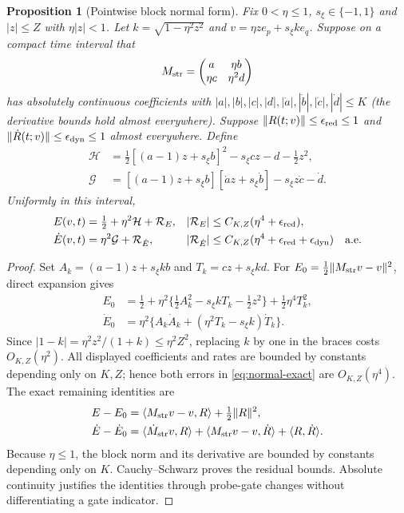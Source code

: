 \documentclass[10pt]{article}
\newtheorem{proposition}[theorem]{Proposition}
\theoremstyle{remark}\newtheorem{remark}[theorem]{Remark}
\begin{document}
\begin{proposition}[Pointwise block normal form]\label{prop:pointwise-normal}
Fix $0<\eta\le1$, $s_\xi\in\{-1,1\}$ and $|z|\le Z$ with $\eta|z|<1$.
Let $k=\sqrt{1-\eta^2z^2}$ and $v=\eta z e_p+s_\xi k e_q$.
Suppose on a compact time interval that
\[
 M_{\rm str}=\begin{pmatrix}a&\eta b\\\eta c&\eta^2d\end{pmatrix}
\]
has absolutely continuous coefficients with
$|a|,|b|,|c|,|d|,|\dot a|,|\dot b|,|\dot c|,|\dot d|\le K$
(the derivative bounds hold almost everywhere). Suppose
$\|R(t;v)\|\le\epsilon_{\rm red}\le1$ and
$\|\dot R(t;v)\|\le\epsilon_{\rm dyn}\le1$ almost everywhere.
Define
\begin{align}
 \mathcal H&=\tfrac12[(a-1)z+s_\xi b]^2-s_\xi cz-d-\tfrac12z^2,
 \label{eq:normal-H}\\
 \mathcal G&=[(a-1)z+s_\xi b][\dot a z+s_\xi\dot b]
              -s_\xi z\dot c-\dot d.\label{eq:normal-G}
\end{align}
Uniformly in this interval,
\begin{align*}
 E(v,t)&=\tfrac12+\eta^2\mathcal H+\mathcal R_E,
 &|\mathcal R_E|&\le C_{K,Z}(\eta^4+\epsilon_{\rm red}),\\
 \dot E(v,t)&=\eta^2\mathcal G+\mathcal R_{\dot E},
 &|\mathcal R_{\dot E}|&\le C_{K,Z}(\eta^4+\epsilon_{\rm red}+\epsilon_{\rm dyn})
 \quad\text{a.e.}
\end{align*}
\end{proposition}
\begin{proof}
Set $A_k=(a-1)z+s_\xi k b$ and $T_k=cz+s_\xi k d$.
For $E_0=\tfrac12\|M_{\rm str}v-v\|^2$, direct expansion gives
\begin{align}\label{eq:normal-exact}
 E_0&=\tfrac12+\eta^2\{\tfrac12A_k^2-s_\xi kT_k-\tfrac12z^2\}
                     +\tfrac12\eta^4T_k^2,\\
 \dot E_0&=\eta^2\{A_k\dot A_k+(\eta^2T_k-s_\xi k)\dot T_k\}.
 \nonumber
\end{align}
Since $|1-k|=\eta^2z^2/(1+k)\le\eta^2Z^2$, replacing $k$ by one
in the braces costs $O_{K,Z}(\eta^2)$. All displayed coefficients and
rates are bounded by constants depending only on $K,Z$; hence both
errors in \eqref{eq:normal-exact} are $O_{K,Z}(\eta^4)$.
The exact remaining identities are
\begin{align*}
 E-E_0&=\langle M_{\rm str}v-v,R\rangle+\tfrac12\|R\|^2,\\
 \dot E-\dot E_0&=\langle\dot M_{\rm str}v,R\rangle
 +\langle M_{\rm str}v-v,\dot R\rangle+\langle R,\dot R\rangle.
\end{align*}
Because $\eta\le1$, the block norm and its derivative are bounded by
constants depending only on $K$. Cauchy--Schwarz proves the residual
bounds. Absolute continuity justifies the identities through probe-gate
changes without differentiating a gate indicator.
\end{proof}
\end{document}
